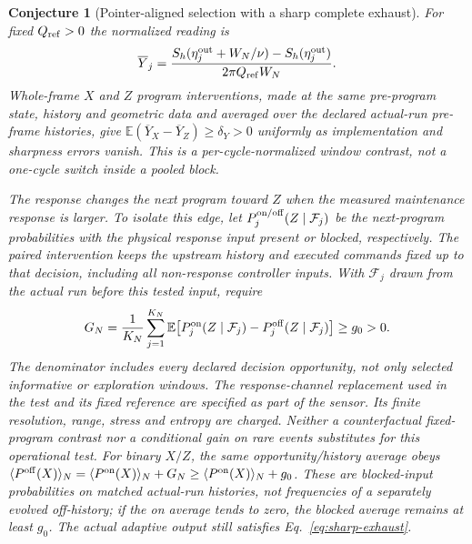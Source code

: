 \documentclass[12pt,a4paper]{article}
\newtheorem{conjecture}[theorem]{Conjecture}
\begin{document}
\begin{conjecture}[Pointer-aligned selection with a sharp complete exhaust]
For fixed $Q_{\rm ref}>0$ the normalized reading is
\begin{equation}\label{eq:window-horizon-reading}
 \overline Y_j=
 \frac{S_h(\eta_j^{\rm out}+W_N/\nu)-S_h(\eta_j^{\rm out})}
      {2\pi Q_{\rm ref}W_N}.
\end{equation}
Whole-frame $X$ and $Z$ program interventions, made at the same
pre-program state, history and geometric data and averaged over the
declared actual-run pre-frame histories, give
$\mathbb E(\overline Y_X-\overline Y_Z)\ge\delta_Y>0$
uniformly as implementation and sharpness errors vanish.
This is a per-cycle-normalized window contrast, not a one-cycle switch
inside a pooled block.

The response changes the next program toward $Z$ when the measured
maintenance response is larger. To isolate this edge, let
$P_j^{\rm on/off}(Z\mid\mathcal F_j)$ be the next-program probabilities with
the physical response input present or blocked, respectively.
The paired intervention keeps the upstream history and executed commands
fixed up to that decision, including all non-response controller inputs.
With $\mathcal F_j$ drawn from the actual run before this tested input, require
\begin{equation}\label{eq:window-response-gain}
 G_N=\frac1{K_N}\sum_{j=1}^{K_N}
       \mathbb E\!\left[P_j^{\rm on}(Z\mid\mathcal F_j)
                       -P_j^{\rm off}(Z\mid\mathcal F_j)\right]\ge g_0>0.
\end{equation}
The denominator includes every declared decision opportunity, not only
selected informative or exploration windows. The response-channel
replacement used in the test and its fixed reference are specified as
part of the sensor. Its finite resolution, range, stress and entropy
are charged. Neither a counterfactual fixed-program contrast nor a
conditional gain on rare events substitutes for this operational test.
For binary $X/Z$, the same opportunity/history average obeys
$\langle P^{\rm off}(X)\rangle_N
=\langle P^{\rm on}(X)\rangle_N+G_N
\ge\langle P^{\rm on}(X)\rangle_N+g_0$.
These are blocked-input probabilities on matched actual-run histories,
not frequencies of a separately evolved off-history; if the on average
tends to zero, the blocked average remains at least $g_0$.
The actual adaptive output still satisfies Eq.~\eqref{eq:sharp-exhaust}.


\end{conjecture}
\end{document}
